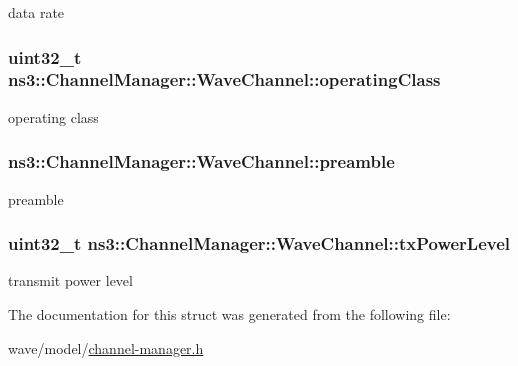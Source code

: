 data rate 

\subsubsection[{\texorpdfstring{operating\+Class}{operatingClass}}]{\setlength{\rightskip}{0pt plus 5cm}uint32\+\_\+t ns3\+::\+Channel\+Manager\+::\+Wave\+Channel\+::operating\+Class}\hypertarget{structns3_1_1ChannelManager_1_1WaveChannel_a66ab0c77b9081e4fa30aca81429cd8a8}{}\label{structns3_1_1ChannelManager_1_1WaveChannel_a66ab0c77b9081e4fa30aca81429cd8a8}


operating class 

\subsubsection[{\texorpdfstring{preamble}{preamble}}]{ ns3\+::\+Channel\+Manager\+::\+Wave\+Channel\+::preamble}\hypertarget{structns3_1_1ChannelManager_1_1WaveChannel_ab3ded83e7113e054b5cce6f4ae6b08e0}{}\label{structns3_1_1ChannelManager_1_1WaveChannel_ab3ded83e7113e054b5cce6f4ae6b08e0}


preamble 

\subsubsection[{\texorpdfstring{tx\+Power\+Level}{txPowerLevel}}]{\setlength{\rightskip}{0pt plus 5cm}uint32\+\_\+t ns3\+::\+Channel\+Manager\+::\+Wave\+Channel\+::tx\+Power\+Level}\hypertarget{structns3_1_1ChannelManager_1_1WaveChannel_aea9e96ab742faa58de5ed912f88c5691}{}\label{structns3_1_1ChannelManager_1_1WaveChannel_aea9e96ab742faa58de5ed912f88c5691}


transmit power level 



The documentation for this struct was generated from the following file\+:\begin{DoxyCompactItemize}
\item 
wave/model/\hyperlink{channel-manager_8h}{channel-\/manager.\+h}\end{DoxyCompactItemize}
